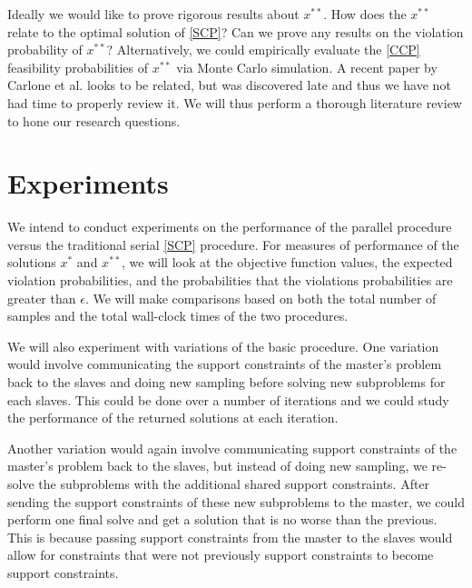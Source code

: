 \documentclass[12pt]{article}
\begin{document}
Ideally we would like to prove rigorous results about $x^{**}$.  How does the $x^{**}$
relate to the optimal solution of \ref{SCP}?  
Can we prove any results on the violation probability of $x^{**}$?
Alternatively, we could empirically evaluate the \ref{CCP} feasibility probabilities of $x^{**}$ 
via Monte Carlo simulation.
A recent paper by Carlone et al. \cite{carlone2014} looks to be related, but was discovered late and thus
we have not had time to properly review it.  We will thus perform a thorough literature review
to hone our research questions.

\section*{Experiments}
We intend to conduct experiments on the performance of the parallel procedure versus the traditional serial \ref{SCP} procedure.
For measures of performance of the solutions $x^*$ and $x^{**}$, we will look at the objective function values, the expected violation probabilities, and the probabilities that the violations probabilities are greater than $\epsilon$.
We will make comparisons based on both the total number of samples and the total wall-clock times of the two procedures.

We will also experiment with variations of the basic procedure.
One variation would involve communicating the support constraints of the master's problem back to the slaves and doing new sampling before solving new subproblems for each slaves.
This could be done over a number of iterations and we could study the performance of the returned solutions at each iteration.

Another variation would again involve communicating support constraints of the master's problem back to the slaves, but instead of doing new sampling, we re-solve the subproblems with the additional shared support constraints.
After sending the support constraints of these new subproblems to the master, we could perform one final solve and get a solution that is no worse than the previous.
This is because passing support constraints from the master to the slaves would allow for constraints that were not previously support constraints to become support constraints.


 
\end{document}

